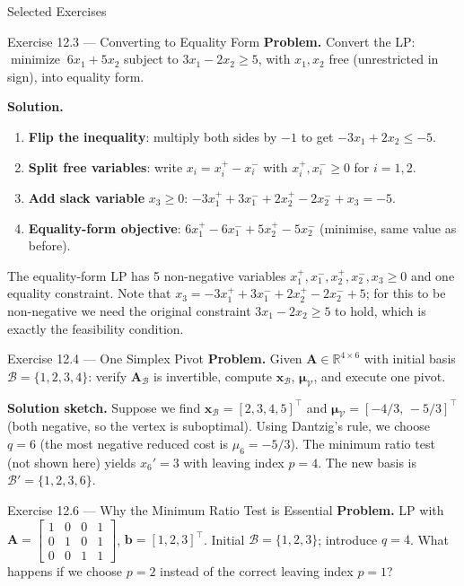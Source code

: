 \documentclass[aspectratio=169,10pt]{beamer}
\DeclareMathOperator*{\minimize}{minimize}
\newcommand{\xv}{\mathbf{x}}
\newcommand{\bv}{\mathbf{b}}
\newcommand{\Av}{\mathbf{A}}
\newcommand{\muv}{\boldsymbol{\mu}}
\newcommand{\calB}{\mathcal{B}}
\newcommand{\calV}{\mathcal{V}}
\begin{document}
\begin{frame}[allowframebreaks]{Selected Exercises}

\begin{block}{Exercise 12.3 --- Converting to Equality Form}
  \textbf{Problem.} Convert the LP: $\minimize\; 6x_1 + 5x_2$
  subject to $3x_1 - 2x_2 \ge 5$, with $x_1, x_2$ free (unrestricted in sign),
  into equality form.

  \textbf{Solution.}
  \begin{enumerate}
    \item \textbf{Flip the inequality}: multiply both sides by $-1$ to get
          $-3x_1 + 2x_2 \le -5$.
    \item \textbf{Split free variables}: write $x_i = x_i^+ - x_i^-$ with
          $x_i^+, x_i^- \ge 0$ for $i = 1, 2$.
    \item \textbf{Add slack variable} $x_3 \ge 0$:
          $-3x_1^+ + 3x_1^- + 2x_2^+ - 2x_2^- + x_3 = -5$.
    \item \textbf{Equality-form objective}:
          $6x_1^+ - 6x_1^- + 5x_2^+ - 5x_2^-$ (minimise, same value as before).
  \end{enumerate}
  The equality-form LP has 5 non-negative variables
  $x_1^+, x_1^-, x_2^+, x_2^-, x_3 \ge 0$ and one equality constraint.
  Note that $x_3 = -3x_1^+ + 3x_1^- + 2x_2^+ - 2x_2^- + 5$; for this to
  be non-negative we need the original constraint $3x_1 - 2x_2 \ge 5$ to hold,
  which is exactly the feasibility condition.
\end{block}

\begin{block}{Exercise 12.4 --- One Simplex Pivot}
  \textbf{Problem.} Given $\Av \in \mathbb{R}^{4\times6}$ with initial basis
  $\calB = \{1,2,3,4\}$: verify $\Av_\calB$ is invertible, compute
  $\xv_\calB$, $\muv_\calV$, and execute one pivot.

  \textbf{Solution sketch.}
  Suppose we find $\xv_\calB = [2,3,4,5]^\top$ and
  $\muv_\calV = [-4/3,\,-5/3]^\top$ (both negative, so the vertex is suboptimal).
  Using Dantzig's rule, we choose $q = 6$ (the most negative reduced cost is
  $\mu_6 = -5/3$).  The minimum ratio test (not shown here) yields $x_6' = 3$
  with leaving index $p = 4$.  The new basis is
  $\calB' = \{1,2,3,6\}$.
\end{block}

\framebreak

\begin{block}{Exercise 12.6 --- Why the Minimum Ratio Test is Essential}
  \textbf{Problem.} LP with
  $\Av = \begin{bmatrix}1&0&0&1\\0&1&0&1\\0&0&1&1\end{bmatrix}$,
  $\bv = [1,2,3]^\top$.
  Initial $\calB = \{1,2,3\}$; introduce $q = 4$.
  What happens if we choose $p = 2$ instead of the correct leaving index $p = 1$?


\end{block}
\end{frame}
\end{document}
